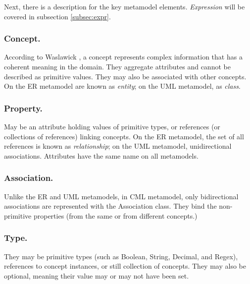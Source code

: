 Next, there is a description for the key metamodel elements. \emph{Expression} will be covered in subsection \ref{subsec:expr}.

\subsubsection{Concept.}

According to Waslawick \cite{wazlawick},
a concept represents complex information that has a coherent meaning in the domain.
They aggregate attributes and cannot be described as primitive values.
They may also be associated with other concepts.
On the ER metamodel are known as \emph{entity};
on the UML metamodel, as \emph{class}.

\subsubsection{Property.}

May be an attribute holding values of primitive types,
or references (or collections of references) linking concepts.
On the ER metamodel,
the set of all references is known as \emph{relationship};
on the UML metamodel, unidirectional associations.
Attributes have the same name on all metamodels.

\subsubsection{Association.}

Unlike the ER and UML metamodels, in CML metamodel, only bidirectional associations are represented with the Association class. They bind the non-primitive properties (from the same or from different concepts.) 


\subsubsection{Type.} They may be primitive types (such as Boolean, String, Decimal, and Regex), references to concept instances, or still collection of concepts. They may also be optional, meaning their value may or may not have been set.
